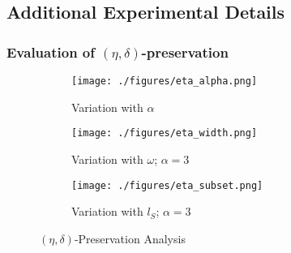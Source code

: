 \subsection{Additional Experimental Details}\label{app:extraresults}
\subsubsection{Evaluation of $(\eta,\delta)$-preservation}\label{app:numerical}

\begin{figure*}[ht]
    \begin{subfigure}[b]{0.32\linewidth}\centering
    \texttt{[image: ./figures/eta\_alpha.png]}
        \caption{Variation with $\alpha$}
        \label{fig:eta:alpha}
    \end{subfigure}
    \begin{subfigure}[b]{0.32\linewidth}\centering
    \texttt{[image: ./figures/eta\_width.png]}
        \caption{Variation with $\omega$; $\alpha = 3$}
        \label{fig:eta:width}
    \end{subfigure}
    \begin{subfigure}[b]{0.32\linewidth}\centering
    \texttt{[image: ./figures/eta\_subset.png]}
        \caption{Variation with $l_S$; $\alpha = 3$}
        \label{fig:eta:subset}
    \end{subfigure}
        \caption{$(\eta,\delta)$-Preservation Analysis}
        \label{fig: eta delta preservation}
\end{figure*}


